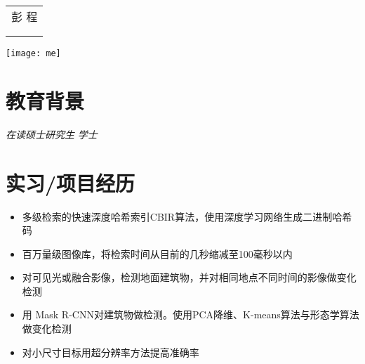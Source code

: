 \documentclass{resume}
\begin{document}

\begin{minipage}{0.7\textwidth}
  \Large{
    \begin{tabu}  { l }
      \scshape{彭 \quad  程} \\
       \\
       \\
    \end{tabu}
  }
\end{minipage}
\begin{minipage}{0.3\textwidth}
  \raggedleft
  \texttt{[image: me]}
\end{minipage}

\section{ 教育背景}
\textit{在读硕士研究生} 
\textit{学士}

\section{ 实习/项目经历}

\begin{itemize}[topsep = 0 pt, partopsep = 0pt]
  \item 多级检索的快速深度哈希索引CBIR算法，使用深度学习网络生成二进制哈希码
  \item 百万量级图像库，将检索时间从目前的几秒缩减至100毫秒以内
\end{itemize}


\begin{itemize}[topsep = 0 pt, partopsep = 0pt]
  \item 对可见光或融合影像，检测地面建筑物，并对相同地点不同时间的影像做变化检测
  \item 用 Mask R-CNN对建筑物做检测。使用PCA降维、K-means算法与形态学算法做变化检测
  \item 对小尺寸目标用超分辨率方法提高准确率
\end{itemize}
\end{document}
